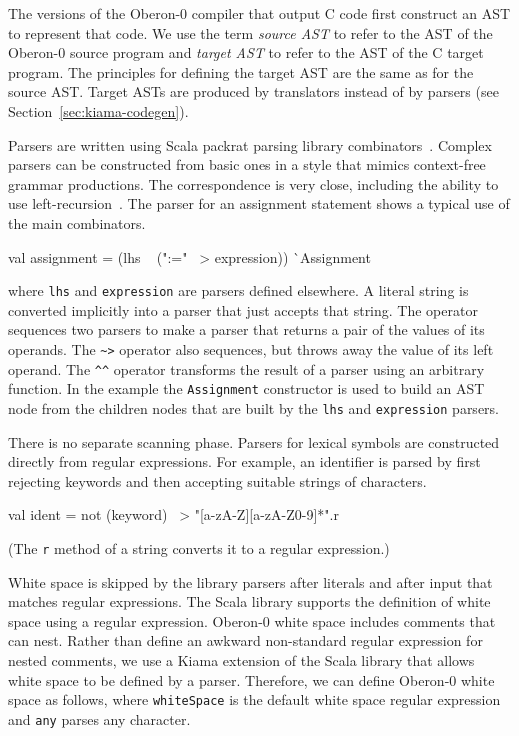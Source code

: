 The versions of the Oberon-0 compiler that output C code first construct an AST to represent that code.
We use the term \emph{source AST} to refer to the AST of the Oberon-0 source program and \emph{target AST} to refer to the AST of the C target program.
The principles for defining the target AST are the same as for the source AST.
Target ASTs are produced by translators instead of by parsers (see Section~\ref{sec:kiama-codegen}).

Parsers are written using Scala packrat parsing library combinators~\cite[chapter 33]{Odersky10d}.
Complex parsers can be constructed from basic ones in a style that mimics context-free grammar productions.
The correspondence is very close, including the ability to use left-recursion~\cite{Warth08}.
The parser for an assignment statement shows a typical use of the main combinators.

\begin{scala}
  val assignment = (lhs ~ (":=" ~> expression)) ^^ Assignment
\end{scala}

\noindent
where \verb|lhs| and \verb|expression| are parsers defined elsewhere.
A literal string is converted implicitly into a parser that just accepts that string.
The \textscala{\~} operator sequences two parsers to make a parser that returns a pair of the values of its operands.
The \verb|~>| operator also sequences, but throws away the value of its left operand.
The \verb|^^| operator transforms the result of a parser using an arbitrary function.
In the example the \verb|Assignment| constructor is used to build an AST node from the children nodes that are built by the \verb|lhs| and \verb|expression| parsers.

There is no separate scanning phase.
Parsers for lexical symbols are constructed directly from regular expressions.
For example, an identifier is parsed by first rejecting keywords and then accepting suitable strings of characters.

\begin{scala}
  val ident = not (keyword) ~> "[a-zA-Z][a-zA-Z0-9]*".r
\end{scala}

\noindent
(The \verb|r| method of a string converts it to a regular expression.)

White space is skipped by the library parsers after literals and after input that matches regular expressions.
The Scala library supports the definition of white space using a regular expression.
Oberon-0 white space includes comments that can nest.
Rather than define an awkward non-standard regular expression for nested comments, we use a Kiama extension of the Scala library that allows white space to be defined by a parser.
Therefore, we can define Oberon-0 white space as follows, where \verb|whiteSpace| is the default white space regular expression and \verb|any| parses any character.

